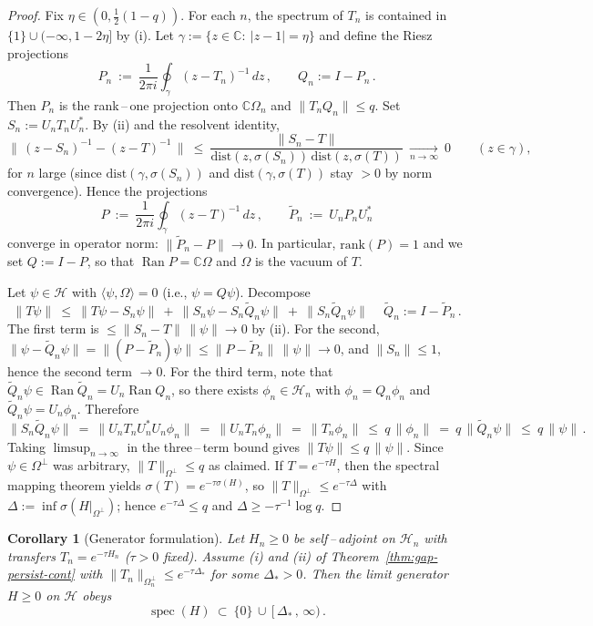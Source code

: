 \documentclass[11pt]{amsart}
\theoremstyle{plain}
\newtheorem{corollary}[theorem]{Corollary}
\theoremstyle{definition}
\theoremstyle{remark}
\renewcommand{\tfrac}[2]{\textstyle\frac{#1}{#2}}
\begin{document}
\begin{proof}
Fix $\eta\in(0,\tfrac{1}{2}(1-q))$. For each $n$, the spectrum of $T_n$ is contained in $\{1\}\cup (-\infty,1-2\eta]$ by (i). Let $\gamma:=\{z\in\mathbb C:\ |z-1|=\eta\}$ and define the Riesz projections
\[
  P_n\ :=\ \frac{1}{2\pi i}\oint_{\gamma} (z-T_n)^{-1}\,dz\,,\qquad Q_n:=I-P_n\,.
\]
Then $P_n$ is the rank\,–\,one projection onto $\mathbb C\Omega_n$ and $\|T_n Q_n\|\le q$. Set $S_n:=U_n T_n U_n^*$. By (ii) and the resolvent identity,
\[
  \big\|\,(z-S_n)^{-1}-(z-T)^{-1}\,\big\|\ \le\ \frac{\|S_n-T\|}{\mathrm{dist}(z,\sigma(S_n))\,\mathrm{dist}(z,\sigma(T))}\ \xrightarrow[n\to\infty]{}\ 0\qquad(z\in\gamma),
\]
for $n$ large (since $\mathrm{dist}(\gamma,\sigma(S_n))$ and $\mathrm{dist}(\gamma,\sigma(T))$ stay $>0$ by norm convergence). Hence the projections
\[
  P\ :=\ \frac{1}{2\pi i}\oint_{\gamma} (z-T)^{-1}\,dz\,,\qquad \widetilde P_n\ :=\ U_n P_n U_n^*
\]
converge in operator norm: $\|\widetilde P_n-P\|\to 0$. In particular, $\mathrm{rank}(P)=1$ and we set $Q:=I-P$, so that $\operatorname{Ran}P=\mathbb C\Omega$ and $\Omega$ is the vacuum of $T$.

Let $\psi\in\mathcal H$ with $\langle\psi,\Omega\rangle=0$ (i.e., $\psi=Q\psi$). Decompose
\[
  \|T\psi\|\ \le\ \|T\psi - S_n\psi\|\ +\ \|S_n\psi - S_n\widetilde Q_n\psi\|\ +\ \|S_n\widetilde Q_n\psi\|\,\quad \widetilde Q_n:=I-\widetilde P_n\,.
\]
The first term is $\le \|S_n-T\|\,\|\psi\|\xrightarrow{}0$ by (ii). For the second, $\|\psi-\widetilde Q_n\psi\|=\| (P-\widetilde P_n)\psi\|\le \|P-\widetilde P_n\|\,\|\psi\|\xrightarrow{}0$, and $\|S_n\|\le 1$, hence the second term $\xrightarrow{}0$. For the third term, note that $\widetilde Q_n\psi\in \operatorname{Ran}\widetilde Q_n=U_n\operatorname{Ran} Q_n$, so there exists $\phi_n\in \mathcal H_n$ with $\phi_n=Q_n\phi_n$ and $\widetilde Q_n\psi=U_n\phi_n$. Therefore
\[
  \|S_n\widetilde Q_n\psi\|\ =\ \|U_n T_n U_n^* U_n\phi_n\|\ =\ \|U_n T_n\phi_n\|\ =\ \|T_n\phi_n\|\ \le\ q\,\|\phi_n\|\ =\ q\,\|\widetilde Q_n\psi\|\ \le\ q\,\|\psi\|\,.
\]
Taking $\limsup_{n\to\infty}$ in the three\,–\,term bound gives $\|T\psi\|\le q\,\|\psi\|$. Since $\psi\in\Omega^{\perp}$ was arbitrary, $\|T\|_{\Omega^{\perp}}\le q$ as claimed. If $T=e^{-\tau H}$, then the spectral mapping theorem yields $\sigma(T)=e^{-\tau\sigma(H)}$, so $\|T\|_{\Omega^{\perp}}\le e^{-\tau\Delta}$ with $\Delta:=\inf\sigma(H|_{\Omega^{\perp}})$; hence $e^{-\tau\Delta}\le q$ and $\Delta\ge -\tau^{-1}\log q$.
\end{proof}

\begin{corollary}[Generator formulation]\label{cor:gap-persist-generator}
Let $H_n\ge 0$ be self\,–\,adjoint on $\mathcal H_n$ with transfers $T_n=e^{-\tau H_n}$ ($\tau>0$ fixed). Assume (i) and (ii) of Theorem~\ref{thm:gap-persist-cont} with $\|T_n\|_{\Omega_n^{\perp}}\le e^{-\tau\Delta_*}$ for some $\Delta_*>0$. Then the limit generator $H\ge 0$ on $\mathcal H$ obeys
\[
  \operatorname{spec}(H)\ \subset\ \{0\}\,\cup\,[\,\Delta_*\,,\,\infty)\,.
\]
\end{corollary}
\end{document}

